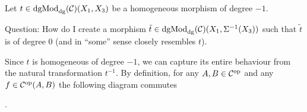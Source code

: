 


\begin{question}
    Let \( t \in \operatorname{dgMod}_{\operatorname{dg}}({\mathcal{C}})(X_1, X_3) \) be a homogeneous morphism of degree \( -1 \).

    Question: How do I create a morphism \( \tilde{t} \in \operatorname{dgMod}_{\operatorname{dg}}({\mathcal{C}})(X_1, \Sigma^{-1}(X_3)) \) such that \( \tilde{t} \) is of degree \( 0 \) (and in ``some'' sense closely resembles \( t \)).

    Since \( t \) is homogeneous of degree \( -1 \), we can capture its entire behaviour from the natural transformation \( t^{-1} \). By definition, for any \( A, B \in {\mathcal{C}}^{\operatorname{op}} \) and any \( f \in {\mathcal{C}}^{\operatorname{op}}(A, B) \) the following diagram commutes
    \begin{center}
        .
    \end{center}


\end{question}
